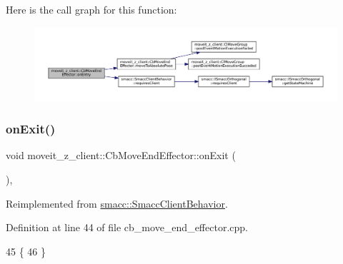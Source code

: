 Here is the call graph for this function\+:
\nopagebreak
\begin{figure}[H]
\begin{center}
\leavevmode
\includegraphics[width=350pt]{classmoveit__z__client_1_1CbMoveEndEffector_a5306018b432c9d8f8a31823f6b317d84_cgraph}
\end{center}
\end{figure}
\mbox{\label{classmoveit__z__client_1_1CbMoveEndEffector_af3fdc6c596da7792cfc9bbef13cb02fc}} 
\subsubsection{\texorpdfstring{on\+Exit()}{onExit()}}
{\footnotesize\ttfamily void moveit\+\_\+z\+\_\+client\+::\+Cb\+Move\+End\+Effector\+::on\+Exit (\begin{DoxyParamCaption}{ }\end{DoxyParamCaption})\hspace{0.3cm}{\ttfamily [override]}, {\ttfamily [virtual]}}



Reimplemented from \hyperlink{classsmacc_1_1SmaccClientBehavior_ac0cd72d42bd00425362a97c9803ecce5}{smacc\+::\+Smacc\+Client\+Behavior}.



Definition at line 44 of file cb\+\_\+move\+\_\+end\+\_\+effector.\+cpp.


\begin{DoxyCode}
45 \{
46 \}
\end{DoxyCode}
\mbox{\label{classmoveit__z__client_1_1CbMoveEndEffector_a09d13b5736a13a811f474b48c6ad43cf}} 
